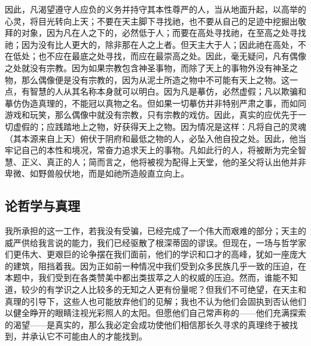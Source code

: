 因此，凡渴望遵守人应负的义务并持守其本性尊严的人，当从地面升起，以高举的心灵，将目光转向上天；不要在天主脚下寻找祂，也不要从自己的足迹中挖掘出敬拜的对象，因为凡在人之下的，必然低于人；而要在高处寻找祂，在至高之处寻找祂；因为没有比人更大的，除非那在人之上者。但天主大于人；因此祂在高处，不在低处；也不应在最底之处寻找，而应在最崇高之处。因此，毫无疑问，凡有偶像之处就没有宗教。因为如果宗教包含神圣事物，而除了天上的事物外没有神圣之物，那么偶像便是没有宗教的，因为从泥土所造之物中不可能有天上之物。这一点，有智慧的人从其名称本身就可以明白。因为凡是摹仿，必然虚假；凡以欺骗和摹仿伪造真理的，不能冠以真物之名。但如果一切摹仿并非特别严肃之事，而如同游戏和玩笑，那么偶像中就没有宗教，只有宗教的戏仿。因此，真实的应优先于一切虚假的；应践踏地上之物，好获得天上之物。因为情况是这样：凡将自己的灵魂（其本源来自上天）俯伏于阴府和最低之物的人，必坠入他自投之处。因此，他当牢记自己的本性和境况，常奋力追求天上的事物。凡如此行的人，将被断为完全智慧、正义、真正的人；简而言之，他将被视为配得上天堂，他的圣父将认出他并非卑微、如野兽般伏地，而是如祂所造般直立向上。\par


\subsection{论哲学与真理}

我所承担的这一工作，若我没有受骗，已经完成了一个伟大而艰难的部分；天主的威严供给我言说的能力，我们已经驱散了根深蒂固的谬误。但现在，一场与哲学家们更伟大、更艰巨的论争摆在我们面前，他们的学识和口才的高峰，犹如一座庞大的建筑，阻挡着我。因为正如前一种情况中我们受到众多民族几乎一致的压迫，在本题中，我们受到在各类赞美中都出类拔萃之人的权威的压迫。然而，谁能不知道，较少的有学识之人比较多的无知之人更有份量呢？但我们不可绝望，在天主和真理的引导下，这些人也可能放弃他们的见解；我也不认为他们会固执到否认他们以健全睁开的眼睛注视光彩照人的太阳。但愿他们自己常声称的——他们充满探索的渴望——是真实的，那么我必定会成功使他们相信那长久寻求的真理终于被找到，并承认它不可能由人的才能找到。\par



